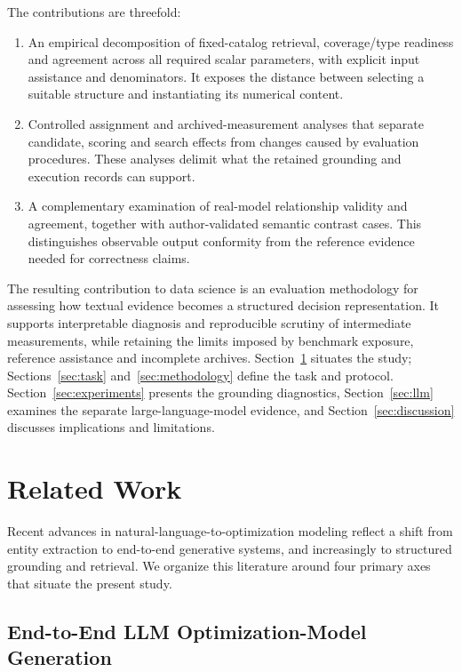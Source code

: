 \documentclass[pdflatex,sn-basic,Numbered]{sn-jnl}
\begin{document}
The contributions are threefold:
\label{subsec:intro_contributions}
\begin{enumerate}
\item An empirical decomposition of fixed-catalog retrieval, coverage/type readiness and agreement across all required scalar parameters, with explicit input assistance and denominators. It exposes the distance between selecting a suitable structure and instantiating its numerical content.
\item Controlled assignment and archived-measurement analyses that separate candidate, scoring and search effects from changes caused by evaluation procedures. These analyses delimit what the retained grounding and execution records can support.
\item A complementary examination of real-model relationship validity and agreement, together with author-validated semantic contrast cases. This distinguishes observable output conformity from the reference evidence needed for correctness claims.
\end{enumerate}

The resulting contribution to data science is an evaluation methodology for assessing how textual evidence becomes a structured decision representation. It supports interpretable diagnosis and reproducible scrutiny of intermediate measurements, while retaining the limits imposed by benchmark exposure, reference assistance and incomplete archives. Section~\ref{sec:related_work} situates the study; Sections~\ref{sec:task} and~\ref{sec:methodology} define the task and protocol. Section~\ref{sec:experiments} presents the grounding diagnostics, Section~\ref{sec:llm} examines the separate large-language-model evidence, and Section~\ref{sec:discussion} discusses implications and limitations.

\section{Related Work}
\label{sec:related_work}

Recent advances in natural-language-to-optimization modeling reflect a shift from entity extraction to end-to-end generative systems, and increasingly to structured grounding and retrieval. We organize this literature around four primary axes that situate the present study.

\subsection{End-to-End LLM Optimization-Model Generation}
\label{subsec:rw_llm_generation}
\end{document}
